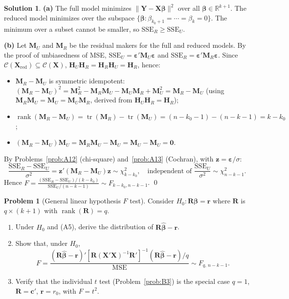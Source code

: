\documentclass[12pt,a4paper]{article}
\theoremstyle{definition}
\newtheorem{exercise}{Problem}
\newtheorem*{solution*}{Solution}
\DeclareMathOperator\tr{tr}
\DeclareMathOperator\rank{rank}
\newcommand{\SSE}{\mathrm{SSE}}
\newcommand{\MSE}{\mathrm{MSE}}
\newcommand{\bX}{\mathbf{X}}
\newcommand{\bY}{\mathbf{Y}}
\def\bb{\boldsymbol{\beta}}
\newcommand{\be}{\boldsymbol{\varepsilon}}
\newcommand{\bH}{\mathbf{H}}
\newcommand{\bM}{\mathbf{M}}
\newcommand{\bR}{\mathbf{R}}
\newcommand{\br}{\mathbf{r}}
\def\bc{\mathbf{c}}
\newcommand{\bzero}{\mathbf{0}}
\newcommand{\bz}{\mathbf{z}}
\newcommand{\Real}{\mathbb{R}}
\newcommand{\calC}{\mathcal{C}}
\begin{document}
\begin{solution*}
\textbf{(a)} The full model minimizes $\|\bY - \bX\bb\|^2$ over all $\bb \in \Real^{k+1}$. The reduced model minimizes over the subspace $\{\bb : \beta_{k_0+1} = \cdots = \beta_k = 0\}$. The minimum over a subset cannot be smaller, so $\SSE_R \geqslant \SSE_U$.

\textbf{(b)} Let $\bM_U$ and $\bM_R$ be the residual makers for the full and reduced models. By the proof of unbiasedness of MSE, $\SSE_U = \be'\bM_U\be$ and $\SSE_R = \be'\bM_R\be$. Since $\calC(\bX_{\text{red}}) \subseteq \calC(\bX)$, $\bH_U\bH_R = \bH_R\bH_U = \bH_R$, hence:
\begin{itemize}[nosep]
\item $\bM_R - \bM_U$ is symmetric idempotent: $(\bM_R - \bM_U)^2 = \bM_R^2 - \bM_R\bM_U - \bM_U\bM_R + \bM_U^2 = \bM_R - \bM_U$ (using $\bM_R\bM_U = \bM_U = \bM_U\bM_R$, derived from $\bH_U\bH_R = \bH_R$);
\item $\rank(\bM_R - \bM_U) = \tr(\bM_R) - \tr(\bM_U) = (n-k_0-1) - (n-k-1) = k - k_0$;
\item $(\bM_R - \bM_U)\bM_U = \bM_R\bM_U - \bM_U = \bM_U - \bM_U = \bzero$.
\end{itemize}
By Problems~\ref{prob:A12} (chi-square) and~\ref{prob:A13} (Cochran), with $\bz = \be/\sigma$:
\[
\frac{\SSE_R - \SSE_U}{\sigma^2} = \bz'(\bM_R - \bM_U)\bz \sim \chi^2_{k-k_0}, \quad \text{independent of } \frac{\SSE_U}{\sigma^2} \sim \chi^2_{n-k-1}.
\]
Hence $F = \frac{(\SSE_R - \SSE_U)/(k-k_0)}{\SSE_U/(n-k-1)} \sim F_{k-k_0, n-k-1}$. \qed
\end{solution*}

\begin{exercise}[General linear hypothesis $F$ test]\label{prob:B5}
Consider $H_0\colon \bR\bb = \br$ where $\bR$ is $q\times(k+1)$ with $\rank(\bR) = q$.
\begin{enumerate}[label=(\alph*),nosep]
\item Under $H_0$ and (A5), derive the distribution of $\bR\hat{\bb} - \br$.
\item Show that, under $H_0$,
\[
F = \frac{(\bR\hat{\bb} - \br)'[\bR(\bX'\bX)^{-1}\bR']^{-1}(\bR\hat{\bb} - \br)/q}{\MSE} \sim F_{q,\, n-k-1}.
\]
\item Verify that the individual $t$ test (Problem~\ref{prob:B3}) is the special case $q=1$, $\bR = \bc'$, $\br = r_0$, with $F = t^2$.
\end{enumerate}
\end{exercise}
\end{document}
